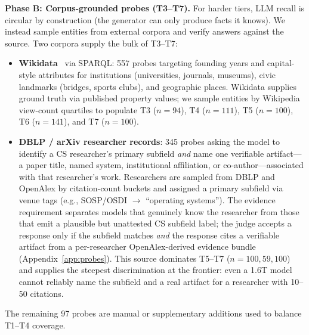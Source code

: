 \documentclass[11pt]{article}
\begin{document}
\textbf{Phase B: Corpus-grounded probes (T3--T7).} For harder tiers, LLM recall is circular by construction (the generator can only produce facts it knows). We instead sample entities from external corpora and verify answers against the source. Two corpora supply the bulk of T3--T7:

\begin{itemize}[leftmargin=*,topsep=2pt,itemsep=2pt,parsep=0pt]
    \item \textbf{Wikidata}~\citep{vrandecic2014wikidata} via SPARQL: 557 probes targeting founding years and capital-style attributes for institutions (universities, journals, museums), civic landmarks (bridges, sports clubs), and geographic places. Wikidata supplies ground truth via published property values; we sample entities by Wikipedia view-count quartiles to populate T3 ($n=94$), T4 ($n=111$), T5 ($n=100$), T6 ($n=141$), and T7 ($n=100$).
    \item \textbf{DBLP / arXiv researcher records}: 345 probes asking the model to identify a CS researcher's primary subfield \emph{and} name one verifiable artifact---a paper title, named system, institutional affiliation, or co-author---associated with that researcher's work. Researchers are sampled from DBLP and OpenAlex by citation-count buckets and assigned a primary subfield via venue tags (e.g., SOSP/OSDI $\to$ ``operating systems''). The evidence requirement separates models that genuinely know the researcher from those that emit a plausible but unattested CS subfield label; the judge accepts a response only if the subfield matches \emph{and} the response cites a verifiable artifact from a per-researcher OpenAlex-derived evidence bundle (Appendix~\ref{app:probes}). This source dominates T5--T7 ($n=100, 59, 100$) and supplies the steepest discrimination at the frontier: even a 1.6T model cannot reliably name the subfield and a real artifact for a researcher with 10--50 citations.
\end{itemize}

The remaining 97 probes are manual or supplementary additions used to balance T1--T4 coverage.
\end{document}
